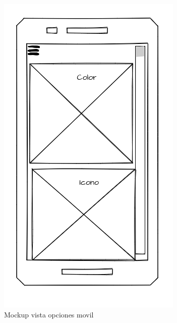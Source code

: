 \documentclass[11pt,spanish,listoffigures,listoftables]{tfgetsinf}
\begin{document}
 \begin{figure}[h!] %
   \includegraphics[width=\linewidth]{img/Vista_Opciones_MVL.png}
   \caption{Mockup vista opciones movil}
   \label{fig:opcionesMVL}
 \end{figure}
\end{document}
